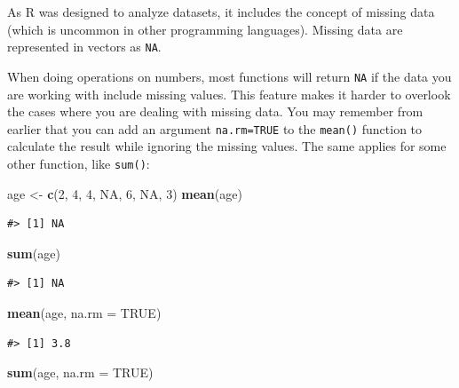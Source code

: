 \documentclass[
]{book}
\newenvironment{Shaded}{\begin{snugshade}}{\end{snugshade}}
\newcommand{\AttributeTok}[1]{\textcolor[rgb]{0.13,0.29,0.53}{#1}}
\newcommand{\ConstantTok}[1]{\textcolor[rgb]{0.56,0.35,0.01}{#1}}
\newcommand{\DecValTok}[1]{\textcolor[rgb]{0.00,0.00,0.81}{#1}}
\newcommand{\FunctionTok}[1]{\textcolor[rgb]{0.13,0.29,0.53}{\textbf{#1}}}
\newcommand{\NormalTok}[1]{#1}
\newcommand{\OtherTok}[1]{\textcolor[rgb]{0.56,0.35,0.01}{#1}}
\begin{document}
As R was designed to analyze datasets, it includes the concept of missing data
(which is uncommon in other programming languages). Missing data are represented
in vectors as \texttt{NA}.

When doing operations on numbers, most functions will return \texttt{NA} if the data
you are working with include missing values. This feature
makes it harder to overlook the cases where you are dealing with missing data.
You may remember from earlier that you can add an argument \texttt{na.rm=TRUE} to the \texttt{mean()} function to calculate the result while ignoring the missing values. The same applies for some other function, like \texttt{sum()}:

\begin{Shaded}
\begin{Highlighting}[]
\NormalTok{age }\OtherTok{\textless{}{-}} \FunctionTok{c}\NormalTok{(}\DecValTok{2}\NormalTok{, }\DecValTok{4}\NormalTok{, }\DecValTok{4}\NormalTok{, }\ConstantTok{NA}\NormalTok{, }\DecValTok{6}\NormalTok{, }\ConstantTok{NA}\NormalTok{, }\DecValTok{3}\NormalTok{)}
\FunctionTok{mean}\NormalTok{(age)}
\end{Highlighting}
\end{Shaded}

\begin{verbatim}
#> [1] NA
\end{verbatim}

\begin{Shaded}
\begin{Highlighting}[]
\FunctionTok{sum}\NormalTok{(age)}
\end{Highlighting}
\end{Shaded}

\begin{verbatim}
#> [1] NA
\end{verbatim}

\begin{Shaded}
\begin{Highlighting}[]
\FunctionTok{mean}\NormalTok{(age, }\AttributeTok{na.rm =} \ConstantTok{TRUE}\NormalTok{)}
\end{Highlighting}
\end{Shaded}

\begin{verbatim}
#> [1] 3.8
\end{verbatim}

\begin{Shaded}
\begin{Highlighting}[]
\FunctionTok{sum}\NormalTok{(age, }\AttributeTok{na.rm =} \ConstantTok{TRUE}\NormalTok{)}
\end{Highlighting}
\end{Shaded}
\end{document}
